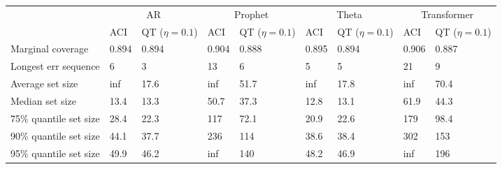 \begin{tabular}{lllllllll}
\toprule
& \multicolumn{2}{c}{AR}& \multicolumn{2}{c}{Prophet}& \multicolumn{2}{c}{Theta}& \multicolumn{2}{c}{Transformer} \\
& ACI & QT ($\eta=0.1$) & ACI & QT ($\eta=0.1$) & ACI & QT ($\eta=0.1$) & ACI & QT ($\eta=0.1$) \\
\midrule
Marginal coverage & 0.894 & 0.894 & 0.904 & 0.888 & 0.895 & 0.894 & 0.906 & 0.887 \\
Longest err sequence & 6 & 3 & 13 & 6 & 5 & 5 & 21 & 9 \\
Average set size & inf & 17.6 & inf & 51.7 & inf & 17.8 & inf & 70.4 \\
Median set size & 13.4 & 13.3 & 50.7 & 37.3 & 12.8 & 13.1 & 61.9 & 44.3 \\
75\% quantile set size & 28.4 & 22.3 & 117 & 72.1 & 20.9 & 22.6 & 179 & 98.4 \\
90\% quantile set size & 44.1 & 37.7 & 236 & 114 & 38.6 & 38.4 & 302 & 153 \\
95\% quantile set size & 49.9 & 46.2 & inf & 140 & 48.2 & 46.9 & inf & 196 \\
\bottomrule
\end{tabular}
